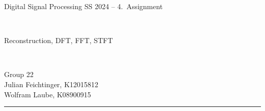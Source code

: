 \documentclass[12pt,a4paper,austrian]{article}
\begin{document}
    \pagestyle{plain}


    \thispagestyle{empty}
    \noindent
    \begin{minipage}[b][4cm]{1.0\textwidth}
        \begin{center}
            \begin{bf}
                \begin{large}
                    Digital Signal Processing SS 2024 -- 4.~Assignment
                \end{large} \\
                \vspace{0.3cm}
                \begin{Large}
                    Reconstruction, DFT, FFT, STFT
                \end{Large} \\
                \vspace{0.3cm}
            \end{bf}
            \begin{large}
                Group 22\\
                Julian Feichtinger, K12015812\\
                Wolfram Laube, K08900915\\
            \end{large}
        \end{center}
    \end{minipage}

    \noindent \rule[0.8em]{\textwidth}{0.12mm}\\[-0.5em]
\end{document}
